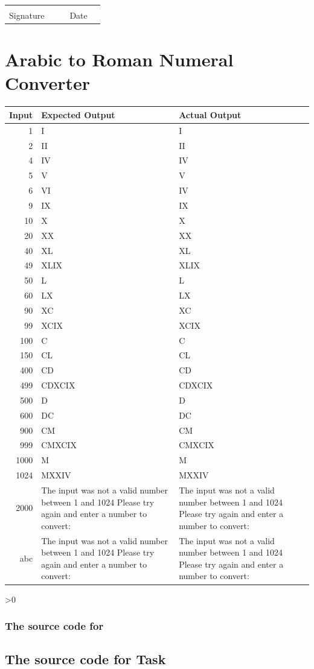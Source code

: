\documentclass[12pt,a4paper,onesided]{report}
\newcommand{\source}{\pagebreak
	\ifnum\value{section}>0
		\subsection{The source code for \thesection}

	\else
		\section{The source code for Task \thechapter}

	\fi
	}
\begin{document}
\vspace{5em}
\begin{table}[h]
	\centering
\begin{tabular}{lp{20ex}p{20ex}lp{20ex}}
	 & & &  & \\\cline{1-2} \cline{4-5}
	 Signature & & & Date &\\
\end{tabular}
\end{table}
\chapter{Arabic to Roman Numeral Converter}
\vspace{-3em}
	\begin{tabular}{rp{38ex}p{38ex}}
		\toprule Input & Expected Output & Actual Output\\
		\midrule
		1 & I & I\\
		2 & II & II\\
		4 & IV & IV\\
		5 & V & V\\
		6 & VI & IV \\
		9 & IX & IX \\
		10 & X & X \\
		20 & XX & XX \\
		40 & XL & XL\\
		49 & XLIX & XLIX\\
		50 & L & L \\
		60 & LX & LX \\
		90 & XC & XC \\
		99 & XCIX & XCIX \\
		100 & C & C\\ 
		150 & CL & CL \\
		400 & CD & CD \\
		499 & CDXCIX & CDXCIX \\
		500 & D & D\\
		600 & DC & DC\\
		900 & CM & CM\\
		999 & CMXCIX & CMXCIX\\
		1000& M & M\\
		1024& MXXIV & MXXIV\\
		2000& The input was not a valid number between 1 and 1024 Please try again and enter a number to convert: &  The input was not a valid number between 1 and 1024 Please try again and enter a number to convert:\\
		abc& The input was not a valid number between 1 and 1024 Please try again and enter a number to convert: &  The input was not a valid number between 1 and 1024 Please try again and enter a number to convert:\\
				
		\bottomrule
				
	\end{tabular}
\source

\end{document}

